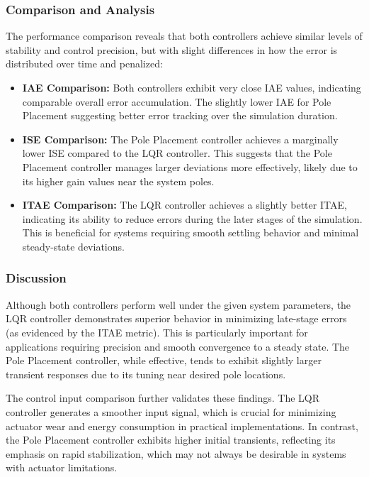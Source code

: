 \documentclass[conference]{IEEEtran}
\begin{document}
\subsubsection{Comparison and Analysis}
The performance comparison reveals that both controllers achieve similar levels of stability and control precision, but with slight differences in how the error is distributed over time and penalized:

\begin{itemize}
    \item \textbf{IAE Comparison:}
    Both controllers exhibit very close IAE values, indicating comparable overall error accumulation. The slightly lower IAE for Pole Placement suggesting better error tracking over the simulation duration.
    \item \textbf{ISE Comparison:}
    The Pole Placement controller achieves a marginally lower ISE compared to the LQR controller. This suggests that the Pole Placement controller manages larger deviations more effectively, likely due to its higher gain values near the system poles.
    \item \textbf{ITAE Comparison:}
    The LQR controller achieves a slightly better ITAE, indicating its ability to reduce errors during the later stages of the simulation. This is beneficial for systems requiring smooth settling behavior and minimal steady-state deviations.
\end{itemize}

\subsubsection{Discussion}
Although both controllers perform well under the given system parameters, the LQR controller demonstrates superior behavior in minimizing late-stage errors (as evidenced by the ITAE metric). This is particularly important for applications requiring precision and smooth convergence to a steady state. The Pole Placement controller, while effective, tends to exhibit slightly larger transient responses due to its tuning near desired pole locations.

The control input comparison further validates these findings. The LQR controller generates a smoother input signal, which is crucial for minimizing actuator wear and energy consumption in practical implementations. In contrast, the Pole Placement controller exhibits higher initial transients, reflecting its emphasis on rapid stabilization, which may not always be desirable in systems with actuator limitations.
\end{document}
